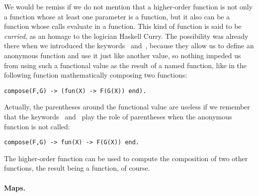 We would be remiss if we do not mention that a higher\hyp{}order
function is not only a function whose at least one parameter is a
function, but it also can be a function whose calls evaluate in a
function. This kind of function is said to be \emph{curried}, as an
homage to the logician Haskell Curry. The possibility was already
there when we introduced the keywords ~and~,
because they allow us to define an anonymous function and use it just
like another value, so nothing impeded us from using such a functional
value as the result of a named function, like in the following
function mathematically composing two functions:
\begin{verbatim}
compose(F,G) -> (fun(X) -> F(G(X)) end).
\end{verbatim}
Actually, the parentheses around the functional value are useless if
we remember that the keywords ~and~ play the
role of parentheses when the anonymous function is not called:
\begin{verbatim}
compose(F,G) -> fun(X) -> F(G(X)) end.
\end{verbatim}
The higher\hyp{}order function  can be used to
compute the composition of two other functions, the result being a
function, of course.

\medskip

\paragraph{Maps.}
\label{maps}

